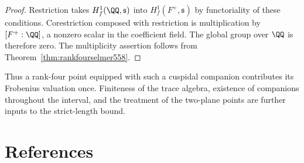 \documentclass[a4paper,11pt]{article}
\theoremstyle{definition}
\theoremstyle{remark}
\numberwithin{equation}{section}
\begin{document}
\begin{proof}
Restriction takes \(H^1_f(\QQ,\mathfrak s)\) into
\(H^1_f(F^+,\mathfrak s)\) by functoriality of these conditions.
Corestriction composed with restriction is multiplication by
\([F^+:\QQ]\), a nonzero scalar in the coefficient field. The
global group over \(\QQ\) is therefore zero. The multiplicity
assertion follows from Theorem~\ref{thm:rankfourselmer558}.
\end{proof}

Thus a rank-four point equipped with such a cuspidal companion
contributes its Frobenius valuation once. Finiteness of the
trace algebra, existence of companions throughout the interval,
and the treatment of the two-plane points are further inputs to
the strict-length bound.

\clearpage
\section{References}\label{nav:bibliography-IX}
\end{document}
